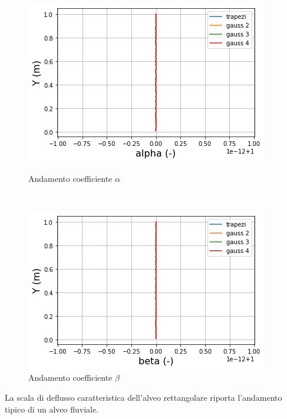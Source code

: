 \documentclass[12pt]{article} %
\begin{document}
\begin{figure}[H]
\begin{minipage}[b]{8.5cm}
\centering
    \includegraphics[width=1 \textwidth]{alpharet.png}
    \caption{Andamento coefficiente $\alpha$}
    \label{fig:rettangolare_alfa}
\end{minipage}
\ \hspace{2mm} \hspace{3mm} \
\begin{minipage}[b]{8.5cm}
    \centering
    \includegraphics[width=1 \textwidth]{betaret.png}
    \caption{Andamento coefficiente $\beta$}
    \label{fig:rettangolare_beta}
\end{minipage}
\end{figure}

\noindent La scala di deflusso caratteristica dell'alveo rettangolare riporta l'andamento tipico di un alveo fluviale.
\end{document}
